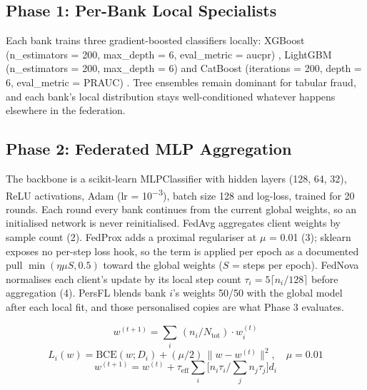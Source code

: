\documentclass[a4paper, 10pt, conference]{ieeeconf}
\begin{document}
\subsection{Phase 1: Per-Bank Local Specialists}
Each bank trains three gradient-boosted classifiers locally: XGBoost
(n\_estimators = 200, max\_depth = 6, eval\_metric = aucpr) \cite{r17}, LightGBM
(n\_estimators = 200, max\_depth = 6) \cite{r18} and CatBoost (iterations = 200,
depth = 6, eval\_metric = PRAUC) \cite{r19}. Tree ensembles remain dominant for
tabular fraud, and each bank's local distribution stays well-conditioned
whatever happens elsewhere in the federation.

\subsection{Phase 2: Federated MLP Aggregation}
The backbone is a scikit-learn MLPClassifier with hidden layers (128, 64, 32),
ReLU activations, Adam (lr = 10\textsuperscript{$-$3}), batch size 128 and
log-loss, trained for 20 rounds. Each round every bank continues from the
current global weights, so an initialised network is never reinitialised. FedAvg
\cite{r5} aggregates client weights by sample count (2). FedProx \cite{r9} adds
a proximal regulariser at $\mu$ = 0.01 (3); sklearn exposes no per-step loss
hook, so the term is applied per epoch as a documented pull
$\min(\eta \mu S, 0.5)$ toward the global weights ($S$ = steps per epoch).
FedNova \cite{r10} normalises each client's update by its local step count
$\tau_i = 5 \lceil n_i/128 \rceil$ before aggregation (4). PersFL \cite{r11}
blends bank $i$'s weights 50/50 with the global model after each local fit, and
those personalised copies are what Phase 3 evaluates.

\begin{equation}
w^{(t+1)} = \textstyle\sum_{i} \, (n_i / N_{\mathrm{tot}}) \cdot w_i^{(t)}
\end{equation}
\begin{equation}
L_i(w) = \mathrm{BCE}(w; D_i) + (\mu/2) \, \lVert w - w^{(t)} \rVert^{2}, \quad \mu = 0.01
\end{equation}
\begin{equation}
w^{(t+1)} = w^{(t)} + \tau_{\mathrm{eff}} \textstyle\sum_i \bigl[ n_i \tau_i \big/ \sum_j n_j \tau_j \bigr] d_i
\end{equation}
\end{document}
